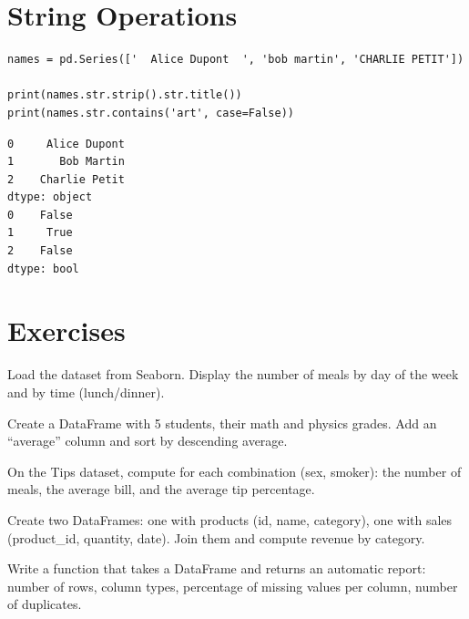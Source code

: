 \section{String Operations}

\begin{codeblock}[title=\textbf{Python --- \texttt{.str} accessor}]
\begin{verbatim}
names = pd.Series(['  Alice Dupont  ', 'bob martin', 'CHARLIE PETIT'])

print(names.str.strip().str.title())
print(names.str.contains('art', case=False))
\end{verbatim}
\end{codeblock}

\begin{codeoutput}
\begin{verbatim}
0     Alice Dupont
1       Bob Martin
2    Charlie Petit
dtype: object
0    False
1     True
2    False
dtype: bool
\end{verbatim}
\end{codeoutput}

\section{Exercises}

\begin{exercise}[$\star$]
Load the  dataset from Seaborn. Display the number of meals by day of the week and by time (lunch/dinner).
\end{exercise}

\begin{exercise}[$\star$]
Create a DataFrame with 5 students, their math and physics grades. Add an ``average'' column and sort by descending average.
\end{exercise}

\begin{exercise}[$\star\star$]
On the Tips dataset, compute for each combination (sex, smoker): the number of meals, the average bill, and the average tip percentage.
\end{exercise}

\begin{exercise}[$\star\star$]
Create two DataFrames: one with products (id, name, category), one with sales (product\_id, quantity, date). Join them and compute revenue by category.
\end{exercise}

\begin{exercise}[$\star\star\star$]
Write a function that takes a DataFrame and returns an automatic report: number of rows, column types, percentage of missing values per column, number of duplicates.
\end{exercise}

